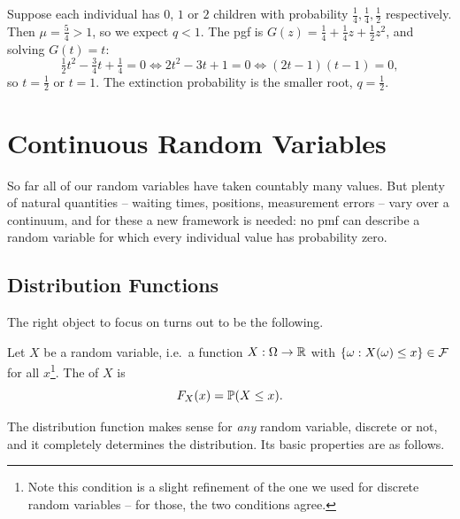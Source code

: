 \documentclass[a4paper]{scrartcl}
\begin{document}
\begin{example}
	Suppose each individual has $0$, $1$ or $2$ children with probability $\frac14, \frac14, \frac12$ respectively. Then $\mu = \frac54 > 1$, so we expect $q < 1$. The pgf is $G(z) = \frac14 + \frac14 z + \frac12 z^2$, and solving $G(t) = t$:
	$$
	\tfrac12 t^2 - \tfrac34 t + \tfrac14 = 0 \iff 2t^2 - 3t + 1 = 0 \iff (2t - 1)(t - 1) = 0,
	$$
	so $t = \frac12$ or $t = 1$. The extinction probability is the smaller root, $q = \frac{1}{2}$.
\end{example}


\section{Continuous Random Variables}

So far all of our random variables have taken countably many values. But plenty of natural quantities -- waiting times, positions, measurement errors -- vary over a continuum, and for these a new framework is needed: no pmf can describe a random variable for which every individual value has probability zero.

\subsection{Distribution Functions}

The right object to focus on turns out to be the following.

\begin{definition}
	Let $X$ be a random variable, i.e.\ a function $X: \Omega \rightarrow \mathbb{R}$ with $\{\omega : X(\omega) \leq x\} \in \mathcal{F}$ for all $x$\footnote{Note this condition is a slight refinement of the one we used for discrete random variables -- for those, the two conditions agree.}. The  of $X$ is
	$$
	F_X(x) = \mathbb{P}(X \leq x).
	$$
\end{definition}

The distribution function makes sense for \emph{any} random variable, discrete or not, and it completely determines the distribution. Its basic properties are as follows.
\end{document}
